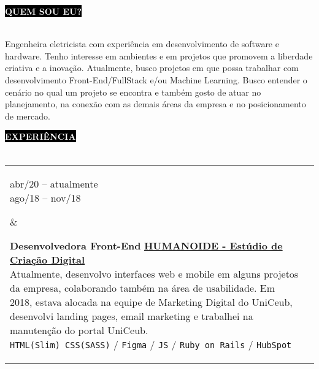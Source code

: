 \documentclass[10pt,A4]{article}
\makeatletter
\newcounter{a}
\newcounter{b}
\newcounter{c}
\newcommand{\cvsection}[1] {
	\textcolor{white}{\MakeUppercase{\textbf{#1}}}
}
\newcommand{\cvsect}[1]{
	\colorbox{black}{{\cvsection{#1}}}\\\\%
}
\newenvironment{entrylist}{%
	\begin{tabular*}{\textwidth}[t]{@{\extracolsep{\fill}}ll}
	}{%
	\end{tabular*}
}
\newcommand{\entry}[4]{%
	\parbox[t]{3.5cm}{%
		#1%
	}%
	&\parbox[t]{14cm}{%
		\textbf{#2}%
		\hfill%
		{\footnotesize \textbf{\textcolor{black}{#3}}}\\%
		#4%
	}\\\\}
\newcommand{\slashsep}{
	\hspace{2mm}/\hspace{2mm}
}
\makeatother
\begin{document}
	\cvsect{Quem sou eu?}%
	\begin{minipage}[t]{1.03\textwidth}%
		Engenheira eletricista com experiência em desenvolvimento de software e hardware. Tenho interesse em ambientes e em projetos que promovem a liberdade criativa e a inovação. Atualmente, busco projetos em que possa trabalhar com desenvolvimento Front-End/FullStack e/ou Machine Learning. Busco entender o cenário no qual um projeto se encontra e também gosto de atuar no planejamento, na conexão com as demais áreas da empresa e no posicionamento de mercado.\\
	\end{minipage}%
	\hfill
	\cvsect{Experiência}
	\begin{entrylist}
		\entry
		{abr/20 – atualmente\\\footnotesize{ago/18 – nov/18}}
		{Desenvolvedora Front-End}
		{\href{https://humanoide.co/}{HUMANOIDE - Estúdio de Criação Digital}}
		{Atualmente, desenvolvo interfaces web e mobile em alguns projetos da empresa, colaborando também na área de usabilidade. Em 2018, estava alocada na equipe de Marketing Digital do UniCeub, desenvolvi landing pages, email marketing e trabalhei na manutenção do portal UniCeub.\\
			\texttt{HTML(Slim) CSS(SASS)} \slashsep\texttt{Figma}\slashsep\texttt{JS}\slashsep\texttt{Ruby on Rails}\slashsep\texttt{HubSpot}}
		\entry
		{jan/20 – mai/20\\\footnotesize{dez/17 - abr/18}}
		{Engenheira de Desenvolvimento}
		{\href{https://gembrap.com/}{GEMBRAP S.A. - Geradores de energia e motores}}
		{Desenvolvimento de motores elétricos de baixo consumo para ventiladores, compressores e exaustores, atuando principalmente na área de eletrônica de potência.\\
			\texttt{Eletrônica de potência}\slashsep\texttt{Prototipagem}\slashsep\texttt{SCRUM}\slashsep\texttt{Impressão 3D}}
		\entry
		{dez/16 – jul/19\\}
		{Co-fundadora e desenvolvedora}
		{\href{https://www.instagram.com/roadiebot/?hl=pt-br}{ROADIEBOT - Tecnologia para música}}
		{Participei de todo o processo de validação e construção da empresa, além de participar da gestão de desenvolvimento, desenvolvimento full-stack do app desktop e do hardware de automação.\\
			\texttt{node.js}\slashsep\texttt{ElectronJS}\slashsep\texttt{HTML CSS JQuery}\slashsep\texttt{Python}\slashsep\texttt{Arduino}\slashsep\texttt{Impressão 3D}\slashsep\texttt{Empreendedorismo científico}}
		\entry
		{nov/18 – mar/19\\}
		{Desenvolvedora Java Jr.}
		{\href{https://www.techis.inf.br/}{TECHIS Intelligent Solutions - Monitoramento de Transporte}}
		{Trabelhei na concepção, planejamento e homologação do novo produto da empresa, operando na integração entre o desenvolvimento de hardware (localizador de caminhão) e de software (sistema de monitoramento e gestão), em conjunto com empresa parceira.\\
			\texttt{Java}\slashsep\texttt{Arduino}\slashsep\texttt{Design Sprint}}
	\end{entrylist}
\end{document}
